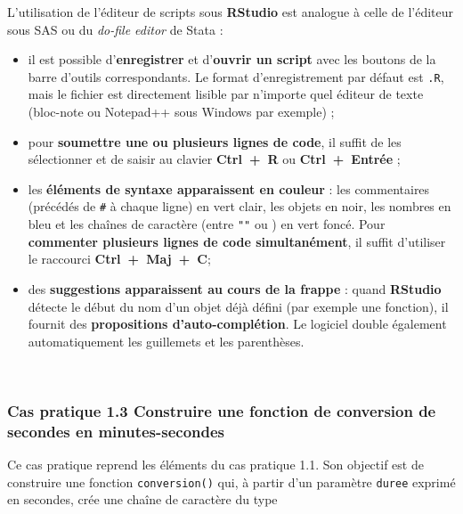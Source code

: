 \documentclass[12pt,twosided, notitlepage]{book}
\providecommand{\tightlist}{%
  \setlength{\itemsep}{0pt}\setlength{\parskip}{0pt}}
\begin{document}
L'utilisation de l'éditeur de scripts sous \textbf{RStudio} est analogue
à celle de l'éditeur sous SAS ou du \emph{do-file editor} de Stata :

\begin{itemize}
\tightlist
\item
  il est possible d'\textbf{enregistrer} et d'\textbf{ouvrir un script}
  avec les boutons de la barre d'outils correspondants. Le format
  d'enregistrement par défaut est \texttt{.R}, mais le fichier est
  directement lisible par n'importe quel éditeur de texte (bloc-note ou
  Notepad++ sous Windows par exemple) ;
\item
  pour \textbf{soumettre une ou plusieurs lignes de code}, il suffit de
  les sélectionner et de saisir au clavier \textbf{Ctrl~+~R} ou
  \textbf{Ctrl~+~Entrée} ;
\item
  les \textbf{éléments de syntaxe apparaissent en couleur} : les
  commentaires (précédés de \texttt{\#} à chaque ligne) en vert clair,
  les objets en noir, les nombres en bleu et les chaînes de caractère
  (entre \texttt{""} ou \texttt{\textquotesingle{}\textquotesingle{}})
  en vert foncé. Pour \textbf{commenter plusieurs lignes de code
  simultanément}, il suffit d'utiliser le raccourci
  \textbf{Ctrl~+~Maj~+~C};
\item
  des \textbf{suggestions apparaissent au cours de la frappe} : quand
  \textbf{RStudio} détecte le début du nom d'un objet déjà défini (par
  exemple une fonction), il fournit des \textbf{propositions
  d'auto-complétion}. Le logiciel double également automatiquement les
  guillemets et les parenthèses.
\end{itemize}

~

\subsubsection{\texorpdfstring{\textbf{Cas pratique 1.3} Construire une
fonction de conversion de secondes en
minutes-secondes}{Cas pratique 1.3 Construire une fonction de conversion de secondes en minutes-secondes}}\label{cas-pratique-1.3-construire-une-fonction-de-conversion-de-secondes-en-minutes-secondes}

Ce cas pratique reprend les éléments du cas pratique 1.1. Son objectif
est de construire une fonction \texttt{conversion()} qui, à partir d'un
paramètre \texttt{duree} exprimé en secondes, crée une chaîne de
caractère du type
\end{document}
